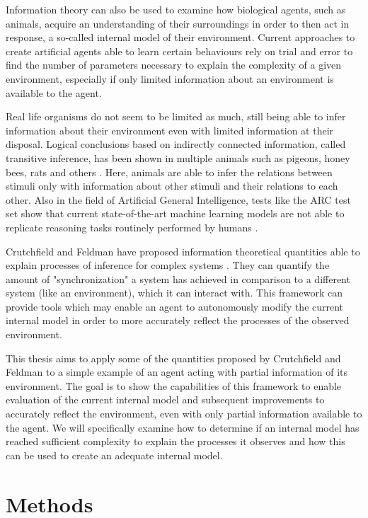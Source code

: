 \documentclass[12pt,a4paper]{article}
\begin{document}
Information theory can also be used to examine how biological agents, such as animals, acquire an understanding of their surroundings in order to then act in response, a so-called internal model of their environment.
Current approaches to create artificial agents able to learn certain behaviours rely on trial and error to find the number of parameters necessary to explain the complexity of a given environment, especially if only limited information about an environment is available to the agent.

Real life organisms do not seem to be limited as much, still being able to infer information about their environment even with limited information at their disposal.
Logical conclusions based on indirectly connected information, called transitive inference, has been shown in multiple animals such as pigeons, honey bees, rats and others \autocite{vasconcelos2008transitive}.
Here, animals are able to infer the relations between stimuli only with information about other stimuli and their relations to each other.
Also in the field of Artificial General Intelligence, tests like the ARC test set \autocite{chollet2019measure} show that current state-of-the-art machine learning models are not able to replicate reasoning tasks routinely performed by humans \autocite{johnson2021fast}.

Crutchfield and Feldman have proposed information theoretical quantities able to explain processes of inference for complex systems \autocite{crutchfield2003regularities}.
They can quantify the amount of "synchronization" a system has achieved in comparison to a different system (like an environment), which it can interact with.
This framework can provide tools which may enable an agent to autonomously modify the current internal model in order to more accurately reflect the processes of the observed environment.

This thesis aims to apply some of the quantities proposed by Crutchfield and Feldman to a simple example of an agent acting with partial information of its environment.
The goal is to show the capabilities of this framework to enable evaluation of the current internal model and subsequent improvements to accurately reflect the environment, even with only partial information available to the agent.
We will specifically examine how to determine if an internal model has reached sufficient complexity to explain the processes it observes and how this can be used to create an adequate internal model.

\newpage
\section{Methods} \label{sec:methods}
\end{document}
